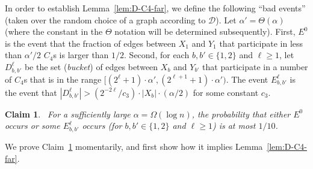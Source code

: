\documentclass{article}
\newtheorem{claim}[lemma]{Claim}
\newcommand{\commentt}[1]{ {}}
\begin{document}
 In order to establish Lemma~\ref{lem:D-C4-far},
 we define the following ``bad events'' (taken over the random choice of a graph according to $\mathcal{D}$). Let $\alpha' = \Theta(\alpha)$ (where the constant in the $\Theta$ notation will be determined subsequently).
First, $E^0$ is the event that the fraction of edges between $X_1$ and $Y_1$ that participate in less than $\alpha'/2$ $C_4$s is larger than $1/2$.
Second, for each $b,b' \in \{1,2\}$ and $\ell \geq 1$, let $D_{b,b'}^\ell$ be the set (\emph{bucket}) of edges between $X_b$ and $Y_{b'}$ that participate in a number of $C_4$s that is in the range $[(2^\ell+1)\cdot \alpha', (2^{\ell+1}+1)\cdot \alpha')$.
The event $E_{b,b'}^\ell$ is the event that $|D_{b,b'}^\ell| > (2^{-2\ell}/c_3)\cdot |X_b|\cdot (\alpha/2)$ for some constant $c_3$.

\begin{claim}~\label{clm:Pr-Es}
For a sufficiently large $\alpha = \Omega(\log n)$,
the probability that either $E^0$ occurs or some $E_{b,b'}^\ell$ occurs (for $b,b' \in \{1,2\}$ and $\ell \geq 1$) is at most $1/10$.
\end{claim}
We prove Claim~\ref{clm:Pr-Es} momentarily, and first show how it implies Lemma~\ref{lem:D-C4-far}.
\end{document}
